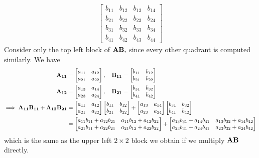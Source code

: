 \documentclass{article}
\begin{document}
\begin{enumerate}
\begin{soln}
\begin{align*}
\begin{bmatrix}
					b_{11} & b_{12} & b_{13} & b_{14} \\
					b_{21} & b_{22} & b_{23} & b_{24} \\
					b_{31} & b_{32} & b_{33} & b_{34} \\
					b_{41} & b_{42} & b_{43} & b_{44}
				\end{bmatrix}
			\end{align*}
			Consider only the top left block of $\bf{AB},$ since every other quadrant is computed similarly. We have
			\begin{align*}
				\bf A_{11} &= \begin{bmatrix}
					a_{11} & a_{12} \\ a_{21} & a_{22}
				\end{bmatrix}, \quad\bf B_{11} =\begin{bmatrix}
					b_{11} & b_{12} \\ b_{21} & b_{22}
				\end{bmatrix} \\
				\bf A_{12} &= \begin{bmatrix}
					a_{13} & a_{14} \\
					a_{23} & a_{24}
				\end{bmatrix}, \quad\bf B_{21} = \begin{bmatrix}
					b_{31} & b_{32} \\ b_{41} & b_{42}
				\end{bmatrix} \\
				\implies \bf{A_{11}B_{11} + A_{12} B_{21} } &= \begin{bmatrix}
					a_{11} & a_{12} \\ a_{21} & a_{22}
				\end{bmatrix}\begin{bmatrix}
					b_{11} & b_{12} \\ b_{21} & b_{22}
				\end{bmatrix} + \begin{bmatrix}
					a_{13} & a_{14} \\
					a_{23} & a_{24}
				\end{bmatrix}\begin{bmatrix}
					b_{31} & b_{32} \\ b_{41} & b_{42}
				\end{bmatrix} \\
				&= \begin{bmatrix}
					a_{11}b_{11} + a_{12}b_{21} & a_{11}b_{12} + a_{12}b_{22} \\
					a_{21}b_{11} + a_{22}b_{21} & a_{21}b_{12} + a_{22}b_{22}
				\end{bmatrix} + \begin{bmatrix}
					a_{13}b_{31} + a_{14}b_{41} & a_{13}b_{32} + a_{14}b_{42} \\
					a_{23}b_{31} + a_{24}b_{41} & a_{23}b_{32} + a_{24}b_{42}
				\end{bmatrix}
			\end{align*}
			which is the same as the upper left $2\times 2$ block we obtain if we multiply $\bf{AB}$ directly.
		\end{soln}


\end{enumerate}
\end{document}
